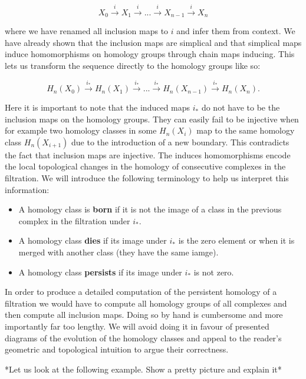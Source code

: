 $$ X_0 \overset{i}{\longrightarrow} X_1 \overset{i}{\longrightarrow} ... \overset{i}{\longrightarrow} X_{n-1} \overset{i}{\longrightarrow} X_n$$


where we have renamed all inclusion maps to $i$ and infer them from context. We have already shown that the inclusion maps are simplical and that simplical maps induce homomorphisms on homology groups through chain maps inducing. This lets us transform the sequence directly to the homology groups like so:

$$ H_n(X_0) \overset{i_*}{\longrightarrow} H_n(X_1) \overset{i_*}{\longrightarrow} ... \overset{i_*}{\longrightarrow} H_n(X_{n-1}) \overset{i_*}{\longrightarrow} H_n(X_n).$$

Here it is important to note that the induced maps $i_*$ do not have to be the inclusion maps on the homology groups. They can easily fail to be injective when for example two homology classes in some $H_n(X_i)$ map to the same homology class $H_n(X_{i+1})$ due to the introduction of a new boundary. This contradicts the fact that inclusion maps are injective. The induces homomorphisms encode the local topological changes in the homology of consecutive complexes in the filtration. We will introduce the following terminology to help us interpret this information:


\begin{itemize}
    \item A homology class is \textbf{born} if it is not the image of a class in the previous complex in the filtration under $i_*$.
    \item A homology class \textbf{dies} if its image under $i_*$ is the zero element or when it is merged with another class (they have the same iamge).
    \item A homology class \textbf{persists} if its image under $i_*$ is not zero.
\end{itemize}

In order to produce a detailed computation of the persistent homology of a filtration we would have to compute all homology groups of all complexes and then compute all inclusion maps. Doing so by hand is cumbersome and more importantly far too lengthy. We will avoid doing it in favour of presented diagrams of the evolution of the homology classes and appeal to the reader's geometric and topological intuition to argue their correctness.

*Let us look at the following example. Show a pretty picture and explain it*

